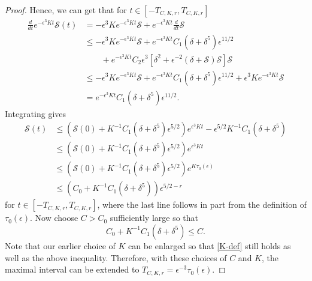 \begin{proof}
	Hence, we can get that for \(t \in [-T_{C,K,r}, T_{C,K,r}]\) 
	\begin{equation*}
	\begin{aligned}
		\frac d {dt} e^{-\epsilon^3 K t} \mathcal S(t) &= - \epsilon^3 K e^{-\epsilon^3 K t} \mathcal S  + e^{-\epsilon^3 K t} \frac d {dt} \mathcal S \\
		&\leq - \epsilon^3 K e^{-\epsilon^3 K t} \mathcal S  + e^{-\epsilon^3 K t}C_1(\delta + \delta^5) \epsilon^{11/2} \\
		&\qquad+ e^{-\epsilon^3 K t}C_2 \epsilon^3\left[ \delta^2 + \epsilon^{-2}(\delta + \mathcal S) \mathcal S \right]\mathcal S \\
		&\leq - \epsilon^3 K e^{-\epsilon^3 K t} \mathcal S  +  e^{-\epsilon^3 K t}C_1(\delta + \delta^5) \epsilon^{11/2} + \epsilon^3 K e^{-\epsilon^3 K t}\mathcal S \\
		&= e^{-\epsilon^3 K t}C_1(\delta + \delta^5) \epsilon^{11/2}.
	\end{aligned}
	\end{equation*}
	Integrating gives
	\begin{equation*} 
	\begin{aligned}
		\mathcal S(t) &\leq \left( \mathcal S(0) + K^{-1} C_1 (\delta+\delta^5) \epsilon^{5/2} \right) e^{\epsilon^3 K t} - \epsilon^{5/2} K^{-1} C_1 (\delta + \delta^5) \\
		&\leq \left( \mathcal S(0) + K^{-1} C_1 (\delta+\delta^5) \epsilon^{5/2} \right) e^{\epsilon^3 K t} \\
		&\leq \left( \mathcal S(0) + K^{-1} C_1 (\delta+\delta^5) \epsilon^{5/2} \right) e^{ K \tau_0(\epsilon)} \\
		&\leq \left( C_0 + K^{-1} C_1 (\delta+\delta^5)  \right) \epsilon^{5/2 -r}
	\end{aligned}
	\end{equation*}
	for \(t \in [-T_{C,K,r}, T_{C,K,r}]\), where the last line follows in part from the definition of \(\tau_0(\epsilon)\). Now choose \(C> C_0\) sufficiently large so that 
	\begin{equation*}
		C_0 + K^{-1} C_1(\delta + \delta^5) \leq C.
	\end{equation*}
	Note that our earlier choice of \(K\) can be enlarged so that \cref{K-def} still holds as well as the above inequality. Therefore, with these choices of \(C\) and \(K\), the maximal interval can be extended to \(T_{C,K,r} = \epsilon^{-3} \tau_0(\epsilon) \). 
\end{proof}